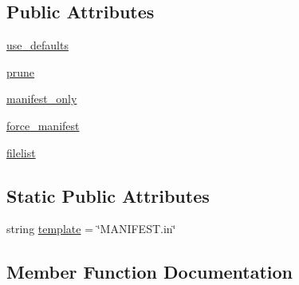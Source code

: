 \subsection*{Public Attributes}
\begin{DoxyCompactItemize}
\item 
\hyperlink{classsetuptools_1_1command_1_1egg__info_1_1manifest__maker_a03b10f5d9682f7561f5dcb2e38f481c1}{use\+\_\+defaults}
\item 
\hyperlink{classsetuptools_1_1command_1_1egg__info_1_1manifest__maker_a9c8082ebc71151c0b73f6bd1a3e136a4}{prune}
\item 
\hyperlink{classsetuptools_1_1command_1_1egg__info_1_1manifest__maker_ab9aeb0d36a2c63a0db350982766d73b6}{manifest\+\_\+only}
\item 
\hyperlink{classsetuptools_1_1command_1_1egg__info_1_1manifest__maker_a541b1e0ddee5af134df09289b06395a3}{force\+\_\+manifest}
\item 
\hyperlink{classsetuptools_1_1command_1_1egg__info_1_1manifest__maker_aab92f131371e14c3dbde6ab997e25bb0}{filelist}
\end{DoxyCompactItemize}
\subsection*{Static Public Attributes}
\begin{DoxyCompactItemize}
\item 
string \hyperlink{classsetuptools_1_1command_1_1egg__info_1_1manifest__maker_acb1f35c6c3f77ec6f79bf0eff75700f2}{template} = \char`\"{}M\+A\+N\+I\+F\+E\+S\+T.\+in\char`\"{}
\end{DoxyCompactItemize}


\subsection{Member Function Documentation}
\hypertarget{classsetuptools_1_1command_1_1egg__info_1_1manifest__maker_a56ca9cec00645cece8ccdf67cc46c2ed}{}
